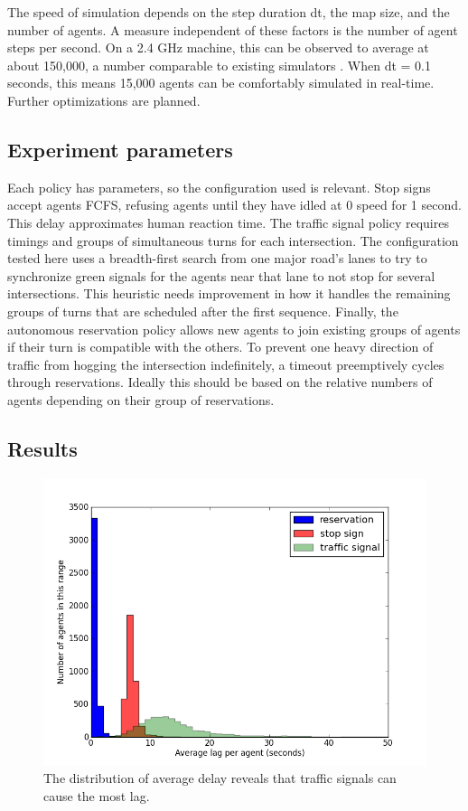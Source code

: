 \documentclass[letterpaper, 10 pt, conference]{ieeeconf}  %
\begin{document}
The speed of simulation depends on the step duration dt, the map size, and the
number of agents. A measure independent of these factors is the number of agent
steps per second. On a 2.4 GHz machine, this can be observed to average at about
150,000, a number comparable to existing simulators \cite{SUMOthesis}. When dt
= 0.1 seconds, this means 15,000 agents can be comfortably simulated in
real-time. Further optimizations are planned.

\subsection{Experiment parameters}

Each policy has parameters, so the configuration used is relevant. Stop signs
accept agents FCFS, refusing agents until they have idled at 0 speed for 1
second. This delay approximates human reaction time. The traffic signal policy
requires timings and groups of simultaneous turns for each intersection. The
configuration tested here uses a breadth-first search from one major road's
lanes to try to synchronize green signals for the agents near that lane to not
stop for several intersections. This heuristic needs improvement in how it
handles the remaining groups of turns that are scheduled after the first
sequence. Finally, the autonomous reservation policy allows new agents to join
existing groups of agents if their turn is compatible with the others. To
prevent one heavy direction of traffic from hogging the intersection
indefinitely, a timeout preemptively cycles through reservations. Ideally this
should be based on the relative numbers of agents depending on their
group of reservations.

\subsection{Results}

\begin{figure}[h]
  \centering \includegraphics[width=\linewidth]{avg_lag_agent_atx.png}
  \caption{The distribution of average delay reveals that traffic signals can
           cause the most lag.}
  \label{fig:avg_lag}
  \vspace{-10pt}
\end{figure}
\end{document}
